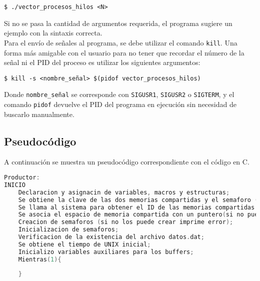 \begin{center}
    \texttt{\$ ./vector\_procesos\_hilos <N>}
\end{center}

Si no se pasa la cantidad de argumentos requerida, el programa sugiere un ejemplo con la sintaxis correcta.\\

Para el envío de señales al programa, se debe utilizar el comando \texttt{kill}. Una forma más amigable con el usuario para no tener que recordar el número de la señal ni el PID del proceso es utilizar los siguientes argumentos:

\begin{center}
    \texttt{\$ kill -s <nombre\_señal>\ \$(pidof vector\_procesos\_hilos)}
\end{center}

Donde \texttt{nombre\_señal} se corresponde con \texttt{SIGUSR1}, \texttt{SIGUSR2} o \texttt{SIGTERM}, y el comando \texttt{pidof} devuelve el PID del programa en ejecución sin necesidad de buscarlo manualmente.\\

\subsection{Pseudocódigo}

A continuación se muestra un pseudocódigo correspondiente con el código en C.\\

\begin{lstlisting}[language=C]          % No usar tildes en el pseudocódigo
Productor:
INICIO
    Declaracion y asignacin de variables, macros y estructuras;
    Se obtiene la clave de las dos memorias compartidas y el semaforo (en el caso de que no las obtenga imprime error);
    Se llama al sistema para obtener el ID de las memorias compartidas (en el caso de que no las obtenga imprime error);
    Se asocia el espacio de memoria compartida con un puntero(si no puede asociar imprime error);
    Creacion de semaforos (si no los puede crear imprime error);
    Inicializacion de semaforos;
    Verificacion de la existencia del archivo datos.dat;
    Se obtiene el tiempo de UNIX inicial;
    Inicializo variables auxiliares para los buffers;
    Mientras(1){
	
    }


\end{lstlisting}